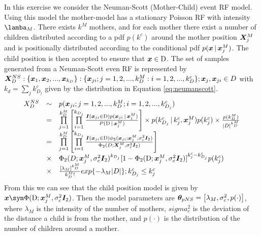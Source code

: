 \section{}
\label{sec:problem3}
In this exercise we consider the Neuman-Scott (Mother-Child) event RF model. Using this model the mother-model has a stationary Poisson RF with intensity $\lamba_M$. There exists $k^M$ mothers, and for each mother there exist a number of children distributed according to a pdf $p(k^c)$ around the mother position $\bm{X}_j^M$ and is positionally distributed according to the conditional pdf $p(\bm{x}\, | \, \bm{x}_j^M)$. The child position is then accepted to ensure that $\bm{x}\in\mathrm{D}$. The set of samples generated from a Neuman-Scott even RF is represented by $\bm{X}_D^{NS}:\{\bm{x}_1,\bm{x}_2,...,\bm{x}_{k_D}\}:\{\bm{x}_{ji};j=1,2,...,k_D^M:i = 1,2,...,k_D^c\};\bm{x}_j,\bm{x}_{ji}\in D$ with $k_d = \sum_j k_{D_j}^c$ given by the distribution in Equation \ref{eq:neumanscott}.
\begin{equation}
    \begin{array}{rcl}
        X_D^{NS} & \sim & p(\bm{x}_{ji}; j = 1,2,...,k_D^M; i =1,2,...,k_{D_j}^c) \\
         & = & \prod\limits_{j=1}^{k_D^M}\left[\prod\limits_{i=1}^{k_{D_j}}\frac{ \bm{I}(\bm{x}_{ji}\in \mathrm{D})p(\bm{x}_{ji}\, | \, \bm{x}_j^M)}{ P(\mathrm{D}\, | \, \bm{x}_j^M)}\right]\times p(k_{D_j}^c\, | \, k_j^c,\bm{x}_j^M)p(k_j^c)\times \frac{p(k_D^M)}{|D|^{k_D^M}} \\
         & = & \prod\limits_{j=1}^{k_D^M}\left[\prod\limits_{i=1}^{k_{D_j}}\frac{ \bm{I}(\bm{x}_{ji}\in \mathrm{D}) \phi_2(\bm{x}_{ji};\bm{x}_j^M,\sigma_c^2\bm{I}_2)}{ \Phi_2(D;\bm{X}_j^M,\sigma_c^2\bm{I}_2 )}\right] \\
         & \times & \Phi_2(D;\bm{x}_j^M,\sigma_c^2\bm{I}_2)^{k_{D_j}}[1-\Phi_2(\mathrm{D};\bm{x}_j^M,\sigma_c^2\bm{I}_2)]^{k_j^c-k_{D_j}^c}p(k_j^c)\\
          & \times & \frac{[\lambda_M]^{k_D^M}}{k_D^M!}exp\{-\lambda_M|D|\};k_{D_j}^c\leq k_j^c
         \end{array}
    \label{eq:neumanscott}
\end{equation}
From this we can see that the child position model is given by $\vect{x} \sym \Phi(\mathrm{D};\vect{x}_j^M, \sigma_c^2\matr{I}_2)$. Then the model parameters are $\bm{\theta}_{pNS} = \left[\lambda_M,\sigma_c^2,p(\cdot)\right]$, where $\lambda_M$ is the intensity of the number of mothers, $sigma_c^2$ is the deviation of the distance a child is from the mother, and $p(\cdot)$ is the distribution of the number of children around a mother. 

